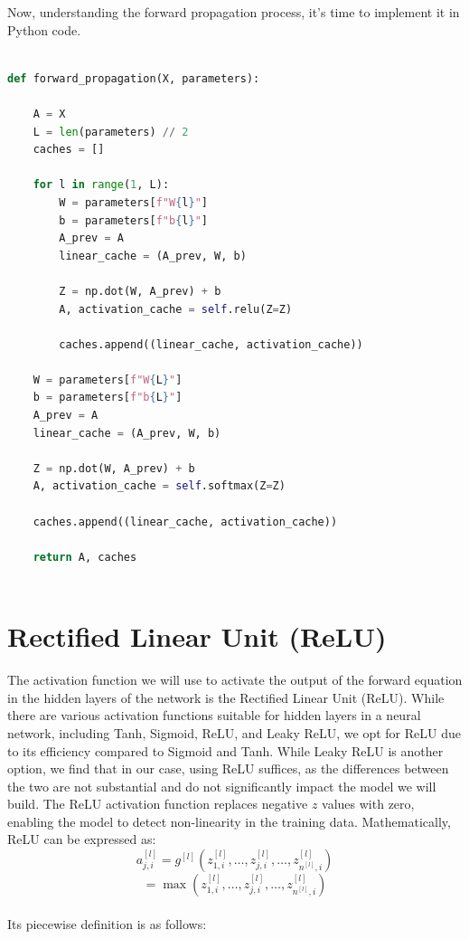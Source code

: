 \documentclass[12pt]{article}
\begin{document}
Now, understanding the forward propagation process, it's time to implement it in Python code.


   
\begin{lstlisting}[language=Python, breaklines=true]

def forward_propagation(X, parameters):

    A = X
    L = len(parameters) // 2
    caches = []

    for l in range(1, L):
        W = parameters[f"W{l}"]
        b = parameters[f"b{l}"]
        A_prev = A
        linear_cache = (A_prev, W, b)

        Z = np.dot(W, A_prev) + b
        A, activation_cache = self.relu(Z=Z)

        caches.append((linear_cache, activation_cache))

    W = parameters[f"W{L}"]
    b = parameters[f"b{L}"]
    A_prev = A
    linear_cache = (A_prev, W, b)

    Z = np.dot(W, A_prev) + b
    A, activation_cache = self.softmax(Z=Z)

    caches.append((linear_cache, activation_cache))

    return A, caches
        
\end{lstlisting}

\section*{\large Rectified Linear Unit (ReLU)}

The activation function we will use to activate the output of the forward equation in the hidden layers of the network is the Rectified Linear Unit (ReLU). While there are various activation functions suitable for hidden layers in a neural network, including Tanh, Sigmoid, ReLU, and Leaky ReLU, we opt for ReLU due to its efficiency compared to Sigmoid and Tanh. While Leaky ReLU is another option, we find that in our case, using ReLU suffices, as the differences between the two are not substantial and do not significantly impact the model we will build.
The ReLU activation function replaces negative $z$ values with zero, enabling the model to detect non-linearity in the training data. Mathematically, ReLU can be expressed as:\\[8px]
$$a^{[l]}_{j,i}=g^{[l]}\left({z^{[l]}_{1,i},\ldots, z^{[l]}_{j,i},\ldots, z^{[l]}_{n^{[l]},i}}\right)$$
$$=\max \left({z^{[l]}_{1,i},\ldots, z^{[l]}_{j,i},\ldots, z^{[l]}_{n^{[l]},i}}\right)$$\\[8px]
Its piecewise definition is as follows:
\end{document}
